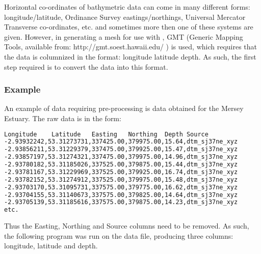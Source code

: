 Horizontal co-ordinates of bathymetric data can come in many different forms: 
longitude/latitude, Ordinance Survey eastings/northings, Universal Mercator Transverse 
co-ordinates, etc. and sometimes more then one of these systems are given. However, 
in generating a mesh for use with \fluidity,
GMT (Generic Mapping Tools, available from: http://gmt.soest.hawaii.edu/ ) is used, which requires 
that the data is columnized in the format: longitude latitude depth. As such, the first step 
required is to convert the data into this format.

\subsubsection*{Example}

An example of data requiring pre-processing is data obtained for the Mersey Estuary. The raw data is in the form:
\begin{lstlisting}[language = Bash]
Longitude    Latitude   Easting   Northing  Depth Source 
-2.93932242,53.31273731,337425.00,379975.00,15.64,dtm_sj37ne_xyz 
-2.93856211,53.31229379,337475.00,379925.00,15.47,dtm_sj37ne_xyz 
-2.93857197,53.31274321,337475.00,379975.00,14.96,dtm_sj37ne_xyz 
-2.93780182,53.31185026,337525.00,379875.00,15.44,dtm_sj37ne_xyz 
-2.93781167,53.31229969,337525.00,379925.00,16.74,dtm_sj37ne_xyz 
-2.93782152,53.31274912,337525.00,379975.00,15.48,dtm_sj37ne_xyz 
-2.93703170,53.31095731,337575.00,379775.00,16.62,dtm_sj37ne_xyz 
-2.93704155,53.31140673,337575.00,379825.00,14.64,dtm_sj37ne_xyz 
-2.93705139,53.31185616,337575.00,379875.00,14.23,dtm_sj37ne_xyz
etc.
\end{lstlisting}


Thus the Easting, Northing and Source columns need to be removed. As such, the following program
was run on the data file, producing three columns: longitude, latitude and depth.

